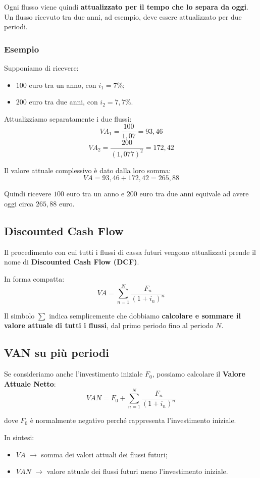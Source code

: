 \noindent Ogni flusso viene quindi \textbf{attualizzato per il tempo che lo separa da oggi}. Un flusso ricevuto tra due anni, ad esempio, deve essere attualizzato per due periodi.

\subsubsection*{Esempio}
Supponiamo di ricevere:
\begin{itemize}
    \item \(100\) euro tra un anno, con \(i_1=7\%\);
    \item \(200\) euro tra due anni, con \(i_2=7{,}7\%\).
\end{itemize}

\noindent Attualizziamo separatamente i due flussi:
\[
VA_1 = \frac{100}{1{,}07} = 93{,}46
\]
\[
VA_2 = \frac{200}{(1{,}077)^2} = 172{,}42
\]

\noindent Il valore attuale complessivo è dato dalla loro somma:
\[
VA = 93{,}46 + 172{,}42 = 265{,}88
\]

\noindent Quindi ricevere \(100\) euro tra un anno e \(200\) euro tra due anni equivale ad avere oggi circa \(265{,}88\) euro.

\subsection{Discounted Cash Flow}
Il procedimento con cui tutti i flussi di cassa futuri vengono attualizzati prende il nome di \textbf{Discounted Cash Flow (DCF)}.

\noindent In forma compatta:
\[
VA = \sum_{n=1}^{N}\frac{F_n}{(1+i_n)^n}
\]

\noindent Il simbolo \(\sum\) indica semplicemente che dobbiamo \textbf{calcolare e sommare il valore attuale di tutti i flussi}, 
dal primo periodo fino al periodo \(N\).

\subsection{VAN su più periodi}
Se consideriamo anche l'investimento iniziale \(F_0\), possiamo calcolare il \textbf{Valore Attuale Netto}:
\[
VAN = F_0 + \sum_{n=1}^{N}\frac{F_n}{(1+i_n)^n}
\]

\noindent dove \(F_0\) è normalmente negativo perché rappresenta l'investimento iniziale.

\noindent In sintesi:
\begin{itemize}
    \item \(VA\) $\rightarrow$ somma dei valori attuali dei flussi futuri;
    \item \(VAN\) $\rightarrow$ valore attuale dei flussi futuri meno l'investimento iniziale.
\end{itemize}


